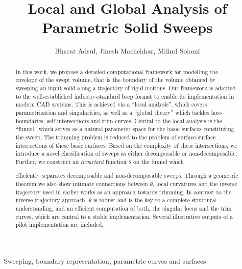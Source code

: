 \documentclass{elsart5p}
\newcommand{\eat}[1]{}
\begin{document}
\begin{frontmatter}




\title{Local and Global Analysis of Parametric Solid Sweeps}


 \author{Bharat Adsul, Jinesh Machchhar, Milind Sohoni}          
\begin{abstract}
In this work, we propose a detailed computational framework for modelling the
envelope of the swept volume, that is the boundary of the volume obtained by
sweeping an input solid along a trajectory of rigid motions. Our framework 
is adapted to the well-established
industry-standard brep format to enable its implementation in modern CAD
systems. This is achieved via a ``local analysis'', which covers
parametrization and singularities, as well as a ``global theory'' which
tackles face-boundaries, self-intersections and trim curves.  Central to
the local analysis is the ``funnel'' which serves as a natural parameter space
for the basic surfaces constituting the sweep. The trimming problem is
reduced to the problem of surface-surface intersections of these basic surfaces.
Based on the complexity of these intersections, we introduce a
novel classification of sweeps as either decomposable or non-decomposable. Further, 
we construct an {\em invariant} function $\theta$ on the funnel which 
\eat{allows us to} 
efficiently separates decomposable and non-decomposable sweeps. 
Through a geometric theorem we also show intimate
connections between $\theta$, local curvatures and
the inverse trajectory used in earlier works as an approach towards trimming.
In contrast to the inverse trajectory approach, $\theta$ is robust
and is the key to a complete structural understanding, and 
\eat{allows} an efficient computation of both, the singular locus and 
the trim curves, which are central to a stable implementation.  
Several illustrative outputs of a pilot implementation are included.
 
\end{abstract}

\begin{keyword}
Sweeping, boundary representation, parametric curves and surfaces
\end{keyword}
\end{frontmatter}
\end{document}
